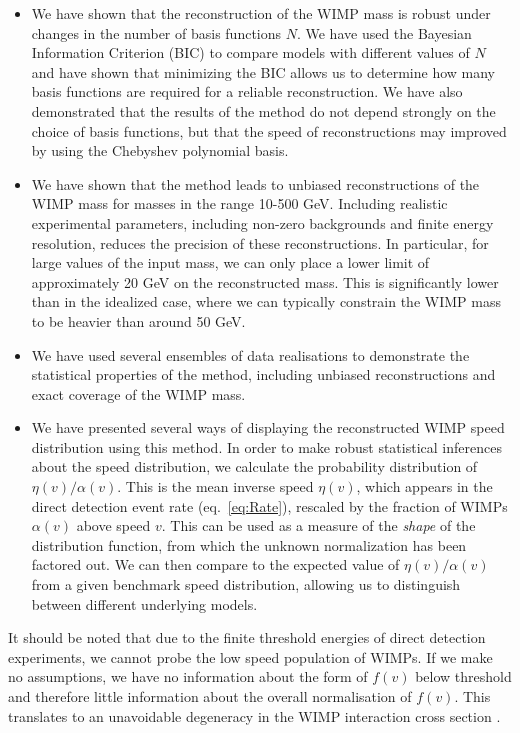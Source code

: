 \begin{itemize}

\item We have shown that the reconstruction of the WIMP mass is robust under changes in the number of basis functions $N$. We have used the Bayesian Information Criterion (BIC) to compare models with different values of $N$ and have shown that minimizing the BIC allows us to determine how many basis functions are required for a reliable reconstruction. We have also demonstrated that the results of the method do not depend strongly on the choice of basis functions, but that the speed of reconstructions may improved by using the Chebyshev polynomial basis.

\item We have shown that the method leads to unbiased reconstructions of the WIMP mass for masses in the range 10-500 GeV. Including realistic experimental parameters, including non-zero backgrounds and finite energy resolution, reduces the precision of these reconstructions. In particular, for large values of the input mass, we can only place a lower limit of approximately 20 GeV on the reconstructed mass. This is significantly lower than in the idealized case, where we can typically constrain the WIMP mass to be heavier than around 50 GeV.

\item We have used several ensembles of data realisations to demonstrate the statistical properties of the method, including unbiased reconstructions and exact coverage of the WIMP mass.

\item We have presented several ways of displaying the reconstructed WIMP speed distribution using this method. In order to make robust statistical inferences about the speed distribution, we calculate the probability distribution of $\eta(v)/\alpha(v)$. This is the mean inverse speed $\eta(v)$, which appears in the direct detection event rate (eq.~\ref{eq:Rate}), rescaled by the fraction of WIMPs $\alpha(v)$ above speed $v$. This can be used as a measure of the \textit{shape} of the distribution function, from which the unknown normalization has been factored out. We can then compare to the expected value of $\eta(v)/\alpha(v)$ from a given benchmark speed distribution, allowing us to distinguish between different underlying models.
\end{itemize}

It should be noted that due to the finite threshold energies of direct detection experiments, we cannot probe the low speed population of WIMPs. If we make no assumptions, we have no information about the form of $f(v)$ below threshold and therefore little information about the overall normalisation of $f(v)$. This translates to an unavoidable degeneracy in the WIMP interaction cross section \sigmapsi. 

